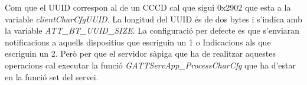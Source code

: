 Com que el UUID correspon al de un CCCD cal que sigui 0x2902 que esta a la variable \textit{clientCharCfgUUID}.
La longitud del UUID és de dos bytes i s'indica amb la variable \textit{ATT\_BT\_UUID\_SIZE}.
La configuració per defecte es que s'enviaran notificacions a aquells dispositius que escriguin un 1 o Indicacions als que escriguin un 2.
Però per que el servidor sàpiga que ha de realitzar aquestes operacions cal executar la funció \textit{GATTServApp\_ProcessCharCfg} que ha d'estar en la funció set del servei.









